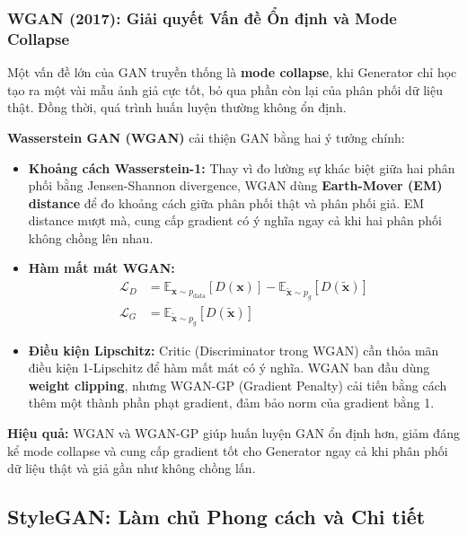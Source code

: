 \subsubsection{WGAN (2017): Giải quyết Vấn đề Ổn định và Mode Collapse}
\label{subsubsec:wgan}

Một vấn đề lớn của GAN truyền thống là \textbf{mode collapse}, khi Generator chỉ học tạo ra một vài mẫu ảnh giả cực tốt, bỏ qua phần còn lại của phân phối dữ liệu thật. Đồng thời, quá trình huấn luyện thường không ổn định.

\textbf{Wasserstein GAN (WGAN)} \cite{Arjovsky2017} cải thiện GAN bằng hai ý tưởng chính:

\begin{itemize}
	\item \textbf{Khoảng cách Wasserstein-1:}  
	Thay vì đo lường sự khác biệt giữa hai phân phối bằng Jensen-Shannon divergence, WGAN dùng \textbf{Earth-Mover (EM) distance} để đo khoảng cách giữa phân phối thật và phân phối giả. EM distance mượt mà, cung cấp gradient có ý nghĩa ngay cả khi hai phân phối không chồng lên nhau.
	
	\item \textbf{Hàm mất mát WGAN:}
	\begin{align}
		\mathcal{L}_D &= \mathbb{E}_{\mathbf{x} \sim p_{\text{data}}} [D(\mathbf{x})] - \mathbb{E}_{\tilde{\mathbf{x}} \sim p_g} [D(\tilde{\mathbf{x}})] \\
		\mathcal{L}_G &= \mathbb{E}_{\tilde{\mathbf{x}} \sim p_g} [D(\tilde{\mathbf{x}})]
	\end{align}
	
	\item \textbf{Điều kiện Lipschitz:}  
	Critic (Discriminator trong WGAN) cần thỏa mãn điều kiện 1-Lipschitz để hàm mất mát có ý nghĩa. WGAN ban đầu dùng \textbf{weight clipping}, nhưng WGAN-GP (Gradient Penalty) cải tiến bằng cách thêm một thành phần phạt gradient, đảm bảo norm của gradient bằng 1.
\end{itemize}

\textbf{Hiệu quả:}  
WGAN và WGAN-GP giúp huấn luyện GAN ổn định hơn, giảm đáng kể mode collapse và cung cấp gradient tốt cho Generator ngay cả khi phân phối dữ liệu thật và giả gần như không chồng lấn.

\subsection{StyleGAN: Làm chủ Phong cách và Chi tiết}
\label{subsec:stylegan}

